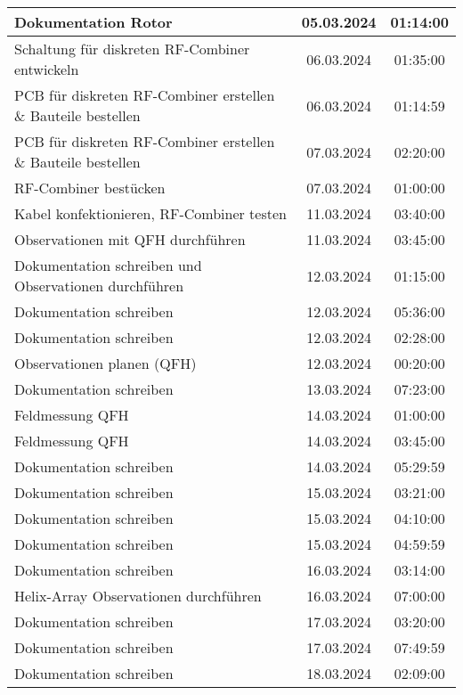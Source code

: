 \begin{longtable}{|l|c|c|}
	\hline
	Dokumentation Rotor & 05.03.2024 & 01:14:00 \\
	\hline
	Schaltung für diskreten RF-Combiner entwickeln  & 06.03.2024 & 01:35:00 \\
	\hline
	PCB für diskreten RF-Combiner erstellen \& Bauteile bestellen & 06.03.2024 & 01:14:59 \\
	\hline
	PCB für diskreten RF-Combiner erstellen \& Bauteile bestellen & 07.03.2024 & 02:20:00 \\
	\hline
	RF-Combiner bestücken & 07.03.2024 & 01:00:00 \\
	\hline
	Kabel konfektionieren, RF-Combiner testen & 11.03.2024 & 03:40:00 \\
	\hline
	Observationen mit QFH durchführen & 11.03.2024 & 03:45:00 \\
	\hline
	Dokumentation schreiben und Observationen durchführen & 12.03.2024 & 01:15:00 \\
	\hline
	Dokumentation schreiben & 12.03.2024 & 05:36:00 \\
	\hline
	Dokumentation schreiben & 12.03.2024 & 02:28:00 \\
	\hline
	Observationen planen (QFH) & 12.03.2024 & 00:20:00 \\
	\hline
	Dokumentation schreiben & 13.03.2024 & 07:23:00 \\
	\hline
	Feldmessung QFH & 14.03.2024 & 01:00:00 \\
	\hline
	Feldmessung QFH & 14.03.2024 & 03:45:00 \\
	\hline
	Dokumentation schreiben & 14.03.2024 & 05:29:59 \\
	\hline
	Dokumentation schreiben & 15.03.2024 & 03:21:00 \\
	\hline
	Dokumentation schreiben & 15.03.2024 & 04:10:00 \\
	\hline
	Dokumentation schreiben & 15.03.2024 & 04:59:59 \\
	\hline
	Dokumentation schreiben & 16.03.2024 & 03:14:00 \\
	\hline
	Helix-Array Observationen durchführen & 16.03.2024 & 07:00:00 \\
	\hline
	Dokumentation schreiben & 17.03.2024 & 03:20:00 \\
	\hline
	Dokumentation schreiben & 17.03.2024 & 07:49:59 \\
	\hline
	Dokumentation schreiben & 18.03.2024 & 02:09:00 \\
	\hline
\end{longtable}
